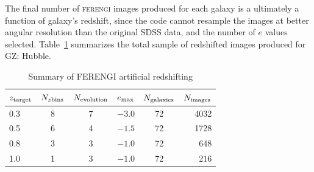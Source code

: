 \documentclass[usenatbib]{mn2e}
\newcommand{\ferengi}{\textsc{ferengi}}
\begin{document}
The final number of \ferengi{} images produced for each galaxy is a ultimately a function of galaxy's redshift, since the code cannot resample the images at better angular resolution than the original SDSS data, and the number of $e$ values selected. Table~\ref{ferengivalues} summarizes the total sample of redshifted images produced for GZ: Hubble. 

\begin{table}
\caption{Summary of FERENGI artificial redshifting \label{ferengivalues}}
\begin{tabular}{lccccr}
\hline\hline
$z_{\rm target}$ & $N_{z {\rm bins}}$ & $N_{\rm evolution}$ & $e_{\rm max}$ & $N_{\rm galaxies}$ & $N_{\rm images}$\\
\hline
0.3              & 8                  & 7                   & $-3.0$        & 72             & 4032 \\
0.5              & 6                  & 4                   & $-1.5$        & 72             & 1728 \\
0.8              & 3                  & 3                   & $-1.0$        & 72             &  648 \\
1.0              & 1                  & 3                   & $-1.0$        & 72             &  216 \\
\hline\hline
\end{tabular}
\end{table}
\end{document}
